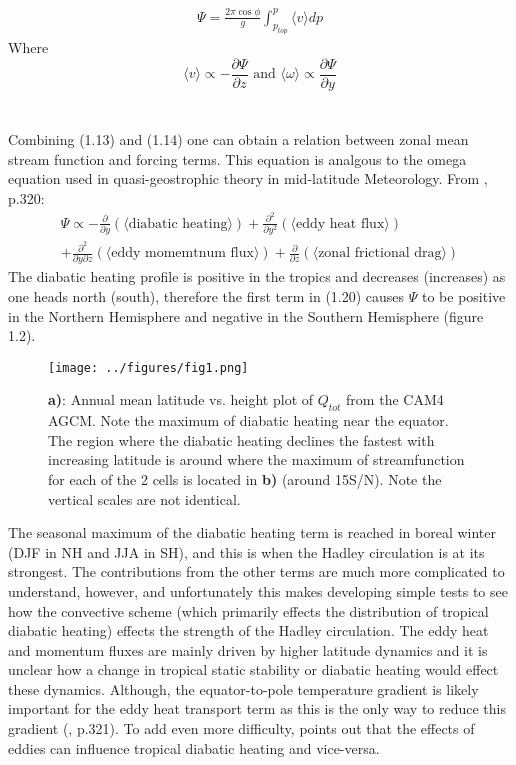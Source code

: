 \documentclass[letterpaper,12pt,titlepage,oneside,final]{book}
\begin{document}
\begin{align}
\Psi=\frac{2\pi\cos{\phi}}{g}\int_{p_{top}}^{p} \langle{v}\rangle{dp}
\end{align}
Where
\begin{equation}\label{eq:test}
\langle{v}\rangle \propto -\frac{\partial{\Psi}}{\partial{z}} \text{ and } \langle{\omega}\rangle \propto\frac{\partial{\Psi}}{\partial{y}}
\end{equation}
\\
\\
Combining (1.13) and (1.14) one can obtain a relation between zonal mean stream function and forcing terms. This equation is analgous to the omega equation used in quasi-geostrophic theory in mid-latitude Meteorology. From \citep{holton_introduction_2004}, p.320:
\begin{equation}
\begin{split}
\Psi \propto -\frac{\partial}{\partial{y}}(\langle\text{diabatic heating}\rangle) + \frac{\partial^{2}}{\partial{y^{2}}}(\langle\text{eddy heat flux}\rangle) \\ + \frac{\partial^{2}}{\partial{y}\partial{z}}(\langle\text{eddy momemtnum flux}\rangle) + \frac{\partial}{\partial{z}}(\langle\text{zonal frictional drag}\rangle) 
\end{split}
\end{equation}
The diabatic heating profile is positive in the tropics and decreases (increases) as one heads north (south), therefore the first term in (1.20) causes $\Psi$ to be positive in the Northern Hemisphere and negative in the Southern Hemisphere (figure 1.2).

\begin{figure}[H]
\centering
\noindent\texttt{[image: ../figures/fig1.png]}\hfill
\caption{\textbf{a)}: Annual mean latitude vs. height plot of $Q_{tot}$ from the CAM4 AGCM. Note the maximum of diabatic heating near the equator. The region where the diabatic heating declines the fastest with increasing latitude is around where the maximum of streamfunction for each of the 2 cells is located in \textbf{b)} (around 15S/N). Note the vertical scales are not identical.}
\end{figure}

The seasonal maximum of the diabatic heating term is reached in boreal winter (DJF in NH and JJA in SH), and this is when the Hadley circulation is at its strongest. The contributions from the other terms are much more complicated to understand, however, and unfortunately this makes developing simple tests to see how the convective scheme (which primarily effects the distribution of tropical diabatic heating) effects the strength of the Hadley circulation. The eddy heat and momentum fluxes are mainly driven by higher latitude dynamics and it is unclear how a change in tropical static stability or diabatic heating would effect these dynamics. Although, the equator-to-pole temperature gradient is likely important for the eddy heat transport term as this is the only way to reduce this gradient (\citep{holton_introduction_2004}, p.321). To add even more difficulty, \citep{kim_hadley_2001} points out that the effects of eddies can influence tropical diabatic heating and vice-versa.
\end{document}
